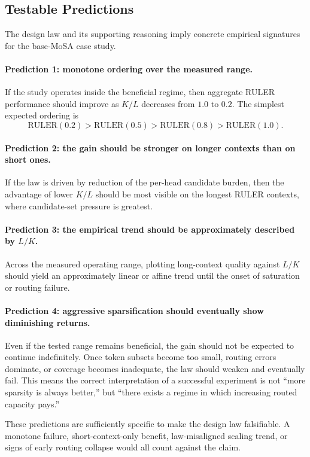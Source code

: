 \documentclass[11pt]{article}
\begin{document}
\subsection{Testable Predictions}

The design law and its supporting reasoning imply concrete empirical signatures for the base-MoSA case study.

\paragraph{Prediction 1: monotone ordering over the measured range.}
If the study operates inside the beneficial regime, then aggregate RULER performance should improve as $K/L$ decreases from $1.0$ to $0.2$. The simplest expected ordering is
\[
\text{RULER}(0.2) > \text{RULER}(0.5) > \text{RULER}(0.8) > \text{RULER}(1.0).
\]

\paragraph{Prediction 2: the gain should be stronger on longer contexts than on short ones.}
If the law is driven by reduction of the per-head candidate burden, then the advantage of lower $K/L$ should be most visible on the longest RULER contexts, where candidate-set pressure is greatest.

\paragraph{Prediction 3: the empirical trend should be approximately described by $L/K$.}
Across the measured operating range, plotting long-context quality against $L/K$ should yield an approximately linear or affine trend until the onset of saturation or routing failure.

\paragraph{Prediction 4: aggressive sparsification should eventually show diminishing returns.}
Even if the tested range remains beneficial, the gain should not be expected to continue indefinitely. Once token subsets become too small, routing errors dominate, or coverage becomes inadequate, the law should weaken and eventually fail. This means the correct interpretation of a successful experiment is not ``more sparsity is always better,'' but ``there exists a regime in which increasing routed capacity pays.''

These predictions are sufficiently specific to make the design law falsifiable. A monotone failure, short-context-only benefit, law-misaligned scaling trend, or signs of early routing collapse would all count against the claim.
\end{document}
